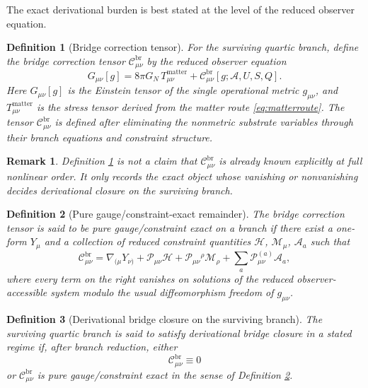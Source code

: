 \documentclass[11pt]{article}
\newcommand{\Sub}{\mathcal{A}}
\newtheorem{definition}{Definition}
\newtheorem{remark}{Remark}
\begin{document}
The exact derivational burden is best stated at the level of the reduced observer equation.

\begin{definition}[Bridge correction tensor]
\label{def:C}
For the surviving quartic branch, define the \emph{bridge correction tensor} \(\mathcal C_{\mu\nu}^{\mathrm{br}}\) by the reduced observer equation
\begin{equation}
G_{\mu\nu}[g]
=
8\pi G_N\,T_{\mu\nu}^{\mathrm{matter}}
+ \mathcal C_{\mu\nu}^{\mathrm{br}}[g;\Sub,U,S,Q].
\label{eq:bridgeeq}
\end{equation}
Here \(G_{\mu\nu}[g]\) is the Einstein tensor of the single operational metric \(g_{\mu\nu}\), and \(T_{\mu\nu}^{\mathrm{matter}}\) is the stress tensor derived from the matter route \eqref{eq:matterroute}. The tensor \(\mathcal C_{\mu\nu}^{\mathrm{br}}\) is defined after eliminating the nonmetric substrate variables through their branch equations and constraint structure.
\end{definition}

\begin{remark}
Definition \ref{def:C} is not a claim that \(\mathcal C_{\mu\nu}^{\mathrm{br}}\) is already known explicitly at full nonlinear order. It only records the exact object whose vanishing or nonvanishing decides derivational closure on the surviving branch.
\end{remark}

\begin{definition}[Pure gauge/constraint-exact remainder]
\label{def:pure}
The bridge correction tensor is said to be \emph{pure gauge/constraint exact} on a branch if there exist a one-form \(Y_\mu\) and a collection of reduced constraint quantities \(\mathcal H\), \(\mathcal M_\mu\), \(\mathcal A_a\) such that
\begin{equation}
\mathcal C_{\mu\nu}^{\mathrm{br}}
=
\nabla_{(\mu}Y_{\nu)}
+ \mathcal P_{\mu\nu}\mathcal H
+ \mathcal P_{\mu\nu}{}^\rho \mathcal M_\rho
+ \sum_a \mathcal P_{\mu\nu}^{(a)}\mathcal A_a,
\label{eq:pure}
\end{equation}
where every term on the right vanishes on solutions of the reduced observer-accessible system modulo the usual diffeomorphism freedom of \(g_{\mu\nu}\).
\end{definition}

\begin{definition}[Derivational bridge closure on the surviving branch]
\label{def:closure}
The surviving quartic branch is said to satisfy \emph{derivational bridge closure} in a stated regime if, after branch reduction, either
\begin{equation}
\mathcal C_{\mu\nu}^{\mathrm{br}}\equiv 0
\label{eq:zero}
\end{equation}
or \(\mathcal C_{\mu\nu}^{\mathrm{br}}\) is pure gauge/constraint exact in the sense of Definition \ref{def:pure}.
\end{definition}
\end{document}
